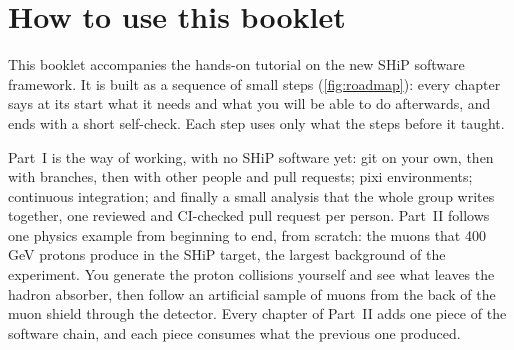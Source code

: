 \chapter*{How to use this booklet}

This booklet accompanies the hands-on tutorial on the new SHiP software
framework. It is built as a sequence of small steps (\cref{fig:roadmap}): every
chapter says at its start what it needs and what you will be able to do
afterwards, and ends with a short self-check. Each step uses only what the
steps before it taught.

Part~I is the way of working, with no SHiP software yet: git on your own, then
with branches, then with other people and pull requests; pixi environments;
continuous integration; and finally a small analysis that the whole group
writes together, one reviewed and CI-checked pull request per person.
Part~II follows one physics example from beginning to end, from scratch: the
muons that 400\,GeV protons produce in the SHiP target, the largest
background of the experiment. You generate the proton collisions yourself and
see what leaves the hadron absorber, then follow an artificial sample of
muons from the back of the muon shield through the detector. Every chapter of Part~II adds one piece of the software chain, and
each piece consumes what the previous one produced.


